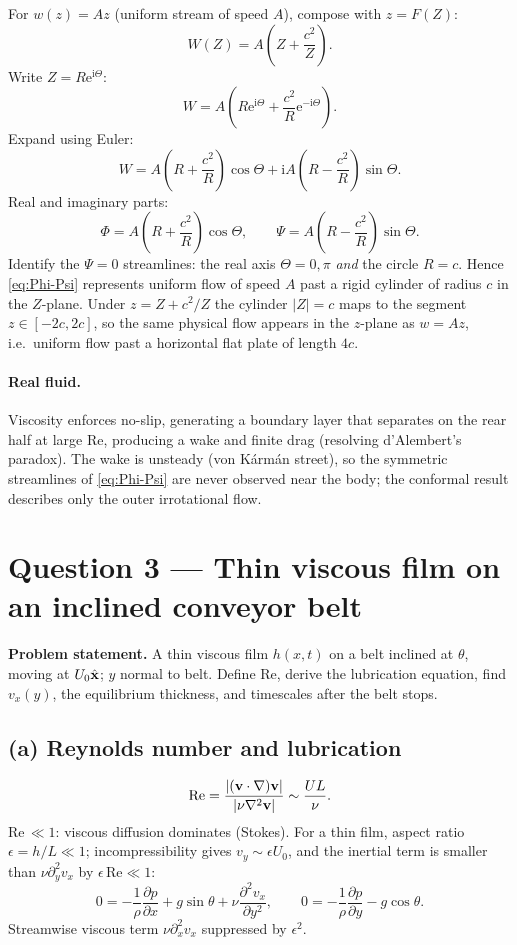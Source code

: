 \documentclass[11pt]{article}
\newcommand{\pd}[2]{\frac{\partial #1}{\partial #2}}
\newcommand{\pdd}[2]{\frac{\partial^{2} #1}{\partial #2^{2}}}
\begin{document}
For $w(z)=Az$ (uniform stream of speed $A$), compose with $z=F(Z)$:
\[ W(Z) = A\!\left(Z + \frac{c^2}{Z}\right). \]
Write $Z=R\mathrm{e}^{\mathrm{i}\Theta}$:
\[ W = A\!\left(R\mathrm{e}^{\mathrm{i}\Theta} + \frac{c^2}{R}\mathrm{e}^{-\mathrm{i}\Theta}\right). \]
Expand using Euler:
\[ W = A\!\left(R+\frac{c^2}{R}\right)\cos\Theta + \mathrm{i}A\!\left(R-\frac{c^2}{R}\right)\sin\Theta. \]
Real and imaginary parts:
\begin{equation}
\boxed{\;\Phi = A\!\left(R+\frac{c^2}{R}\right)\cos\Theta,\qquad \Psi = A\!\left(R-\frac{c^2}{R}\right)\sin\Theta.\;}
\label{eq:Phi-Psi}
\end{equation}
Identify the $\Psi=0$ streamlines: the real axis $\Theta=0,\pi$ \emph{and} the circle $R=c$. Hence \eqref{eq:Phi-Psi} represents uniform flow of speed $A$ past a rigid cylinder of radius $c$ in the $Z$-plane. Under $z=Z+c^2/Z$ the cylinder $|Z|=c$ maps to the segment $z\in[-2c,2c]$, so the same physical flow appears in the $z$-plane as $w=Az$, i.e.\ uniform flow past a horizontal flat plate of length $4c$.

\paragraph{Real fluid.} Viscosity enforces no-slip, generating a boundary layer that separates on the rear half at large Re, producing a wake and finite drag (resolving d'Alembert's paradox). The wake is unsteady (von K\'arm\'an street), so the symmetric streamlines of \eqref{eq:Phi-Psi} are never observed near the body; the conformal result describes only the outer irrotational flow.

\section*{Question 3 --- Thin viscous film on an inclined conveyor belt}

\textbf{Problem statement.} A thin viscous film $h(x,t)$ on a belt inclined at $\theta$, moving at $U_0\hat{\vb x}$; $y$ normal to belt. Define Re, derive the lubrication equation, find $v_x(y)$, the equilibrium thickness, and timescales after the belt stops.

\subsection*{(a) Reynolds number and lubrication}

\[ \mathrm{Re} = \frac{|(\vb v\cdot\nabla)\vb v|}{|\nu\nabla^2\vb v|} \sim \frac{UL}{\nu}. \]
Re$\,\ll 1$: viscous diffusion dominates (Stokes). For a thin film, aspect ratio $\epsilon = h/L\ll 1$; incompressibility gives $v_y\sim\epsilon U_0$, and the inertial term is smaller than $\nu\partial_y^2 v_x$ by $\epsilon\,\mathrm{Re}\ll 1$:
\begin{equation}
0 = -\frac{1}{\rho}\pd{p}{x} + g\sin\theta + \nu\pdd{v_x}{y},\qquad 0 = -\frac{1}{\rho}\pd{p}{y} - g\cos\theta.
\label{eq:NS-lub}
\end{equation}
Streamwise viscous term $\nu\partial_x^2 v_x$ suppressed by $\epsilon^2$.
\end{document}

